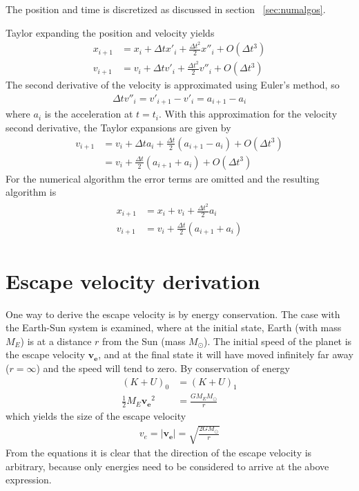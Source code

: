 \documentclass[aps,reprint]{revtex4-1}
\newcommand\blankpage{%
  \null
  \thispagestyle{empty}%
  \addtocounter{page}{-1}%
  \newpage}
\begin{document}
The position and time is discretized as discussed in section ~\ref{sec:numalgos}.

Taylor expanding the position and velocity yields
\begin{align*}
  x_{i+1} &= x_i + \Delta{t} x'_i + \frac{\Delta{t}^2}{2} x''_i + O(\Delta{t}^3) \\
  v_{i+1} &= v_i + \Delta{t} v'_i + \frac{\Delta{t}^2}{2} v''_i + O(\Delta{t}^3)
\end{align*}
The second derivative of the velocity is approximated using Euler's method, so
\begin{align*}
  \Delta{t} v''_i = v'_{i+1} - v'_{i} = a_{i+1} - a_{i}
\end{align*}
where $a_i$ is the acceleration at $t = t_i$. With this approximation for the
velocity second derivative, the Taylor expansions are given by
\begin{align*}
  v_{i+1} &= v_i + \Delta{t} a_i + \frac{\Delta{t}}{2} (a_{i+1} - a_i) + O(\Delta{t}^3) \\
          &= v_i + \frac{\Delta{t}}{2} (a_{i+1} + a_{i}) + O(\Delta{t}^3)
\end{align*}
For the numerical algorithm the error terms are omitted and the resulting
algorithm is
\begin{align}
  \begin{split}
    x_{i+1} &= x_i + v_i + \frac{\Delta{t}^2}{2} a_i \\
    v_{i+1} &= v_i + \frac{\Delta{t}}{2}(a_{i+1} + a_{i})
  \end{split}
\end{align}
\section{Escape velocity derivation}
\label{sec:escapevelocityderivation}
One way to derive the escape velocity is by energy conservation. The case with the Earth-Sun system
is examined, where at the initial state, Earth (with mass $M_E$) is at a
distance $r$ from the Sun (mass $M_\odot$). The
initial speed of the planet is the escape velocity $\mathbf{v_e}$, and at the
final state it will have moved infinitely far away ($r = \infty$) and the speed
will tend to zero. By conservation of energy
\begin{align*}
  (K + U)_0 &= (K + U)_1 \\
  \frac{1}{2} M_E \mathbf{v_e}^2 &= \frac{GM_E M_\odot}{r}
\end{align*}
which yields the size of the escape velocity
\begin{align}
  v_e = |\mathbf{v_e}| = \sqrt{\frac{2GM_\odot}{r}}
\end{align}
From the equations it is clear that the direction of the escape velocity is
arbitrary, because only energies need to be considered to arrive at the above
expression.
\blankpage
\end{document}

